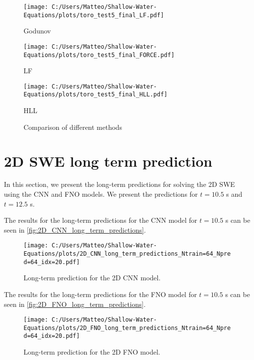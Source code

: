 \begin{figure}[H]
    \centering
    \begin{minipage}{0.45\textwidth}
        \centering
        \texttt{[image: C:/Users/Matteo/Shallow-Water-Equations/plots/toro\_test5\_final\_LF.pdf]}
        \caption{Godunov}
    \end{minipage}%
    \hfill
    \begin{minipage}{0.45\textwidth}
        \centering
        \texttt{[image: C:/Users/Matteo/Shallow-Water-Equations/plots/toro\_test5\_final\_FORCE.pdf]}
        \caption{LF}
    \end{minipage}
    
    \vspace{0.5cm} %
    \begin{minipage}{0.45\textwidth}
        \centering
        \texttt{[image: C:/Users/Matteo/Shallow-Water-Equations/plots/toro\_test5\_final\_HLL.pdf]}
        \caption{HLL}
    \end{minipage}
    \caption{Comparison of different methods}
\end{figure}



\newpage
\section{2D SWE long term prediction}\label{app:2D_SWE_long_term_prediction}
In this section, we present the long-term predictions for solving the 2D SWE using the CNN and FNO models.
We present the predictions for $t = 10.5$ s and $t = 12.5$ s.

The results for the long-term predictions for the CNN model for $t = 10.5$ s can be seen in \autoref{fig:2D_CNN_long_term_predictions}.
\begin{figure}[H]
    \centering
    \texttt{[image: C:/Users/Matteo/Shallow-Water-Equations/plots/2D\_CNN\_long\_term\_predictions\_Ntrain=64\_Npred=64\_idx=20.pdf]}
    \caption{Long-term prediction for the 2D CNN model.}\label{fig:2D_CNN_long_term_predictions}
\end{figure}

The results for the long-term predictions for the FNO model for $t= 10.5$ s can be seen in \autoref{fig:2D_FNO_long_term_predictions}.
\begin{figure}[H]
    \centering
    \texttt{[image: C:/Users/Matteo/Shallow-Water-Equations/plots/2D\_FNO\_long\_term\_predictions\_Ntrain=64\_Npred=64\_idx=20.pdf]}
    \caption{Long-term prediction for the 2D FNO model.}\label{fig:2D_FNO_long_term_predictions}
\end{figure}

